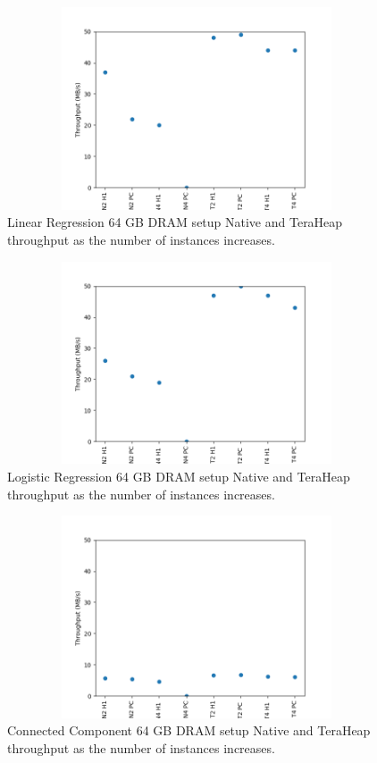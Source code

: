 \documentclass[twocolumn,10pt]{asme2e}
\begin{document}
\begin{figure}[h!]
        \includegraphics[width=13cm,height=6cm]{LINR_64_THR.png}
	\caption{Linear Regression 64 GB DRAM setup Native and TeraHeap throughput as the number of instances increases.}
	\label{fig:linr_64_thr}
\end{figure}

\begin{figure}[h!]
        \includegraphics[width=13cm,height=6cm]{LOGR_64_THR.png}
	\caption{Logistic Regression 64 GB DRAM setup Native and TeraHeap throughput as the number of instances increases.}
	\label{fig:logr_64_thr}
\end{figure}

\begin{figure}[h!]
        \includegraphics[width=13cm,height=6cm]{CC_64_THR.png}
	\caption{Connected Component 64 GB DRAM setup Native and TeraHeap throughput as the number of instances increases.}
	\label{fig:cc_64_thr}
\end{figure}
\end{document}
